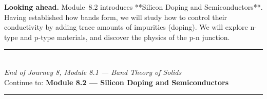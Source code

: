 \documentclass[12pt, a4paper]{book}
\begin{document}
\medskip
\noindent\textbf{Looking ahead.}
Module~8.2 introduces **Silicon Doping and Semiconductors**. Having established how bands form, we will study how to control their conductivity by adding trace amounts of impurities (doping). We will explore n-type and p-type materials, and discover the physics of the p-n junction.

\vspace{1.4cm}
\begin{center}
{\color{JourneyColor}\rule{0.5\linewidth}{0.8pt}}\\[6pt]
{\small\color{JourneyColor}\textit{End of Journey 8, Module 8.1 --- Band Theory of Solids}}\\[4pt]
{\small\color{JourneyColor}Continue to: \textbf{Module 8.2 --- Silicon Doping and Semiconductors}}\\[6pt]
{\color{JourneyColor}\rule{0.5\linewidth}{0.8pt}}
\end{center}
\end{document}
